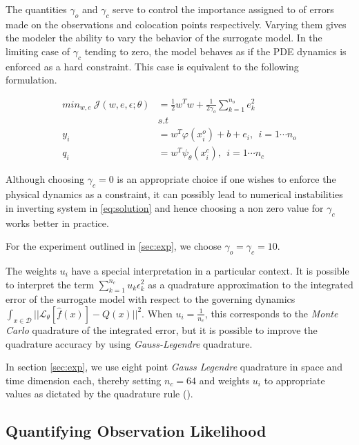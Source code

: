 The quantities $\gamma_o$ and $\gamma_c$ serve to control the importance assigned to
of errors made on the observations and colocation points respectively. Varying them 
gives the modeler the ability to vary the behavior of the surrogate model. In the 
limiting case of $\gamma_c$ tending to zero, the model behaves as if the PDE dynamics
is enforced as a hard constraint. This case is equivalent to the following formulation.

\begin{align}\label{eq:surrogate2}
   min_{w,e} \ \mathcal{J}(w,e,\epsilon;\theta) &= 
   \frac{1}{2} w^{T}w + \frac{1}{2\gamma_{o}} \sum_{k = 1}^{n_{o}}{e^{2}_{k}} \\
  & s.t \nonumber \\
  y_{i} & = w^{T}\varphi(x^{o}_{i}) + b + e_{i}, \ \ i = 1 \cdots n_{o} \\
  q_{i} & = w^{T}\psi_{\theta}(x^{c}_{i}), \ \ i = 1 \cdots n_{c}
\end{align}

Although choosing $\gamma_c = 0$ is an appropriate choice if one wishes
to enforce the physical dynamics as a constraint, it can possibly lead to numerical
instabilities in inverting system in \cref{eq:solution} and hence choosing a non zero value 
for $\gamma_c$ works better in practice.

For the experiment outlined in \ref{sec:exp}, we choose $\gamma_o = \gamma_c = 10$.

The weights $u_i$ have a special interpretation in a particular context. It is possible to
interpret the term $\sum_{k = 1}^{n_{c}}{u_{k} \epsilon^{2}_{k}}$ as a quadrature approximation
to the integrated error of the surrogate model with respect to the governing dynamics $\int_{x \in \mathcal{D}}{||\mathcal{L}_{\theta} [\hat{f}(x)] - Q(x)||^2}$. When
$u_i = \frac{1}{n_c}$, this corresponds to the \emph{Monte Carlo} quadrature of 
the integrated error, but it is possible to improve the quadrature accuracy by using \emph{Gauss-Legendre} quadrature.

In section \ref{sec:exp}, we use eight point \emph{Gauss Legendre} quadrature in space and time dimension each, thereby setting $n_c = 64$ and weights $u_i$ to appropriate values as dictated by the quadrature rule (\citet{_abramowitzm}).

\subsection{Quantifying Observation Likelihood}

